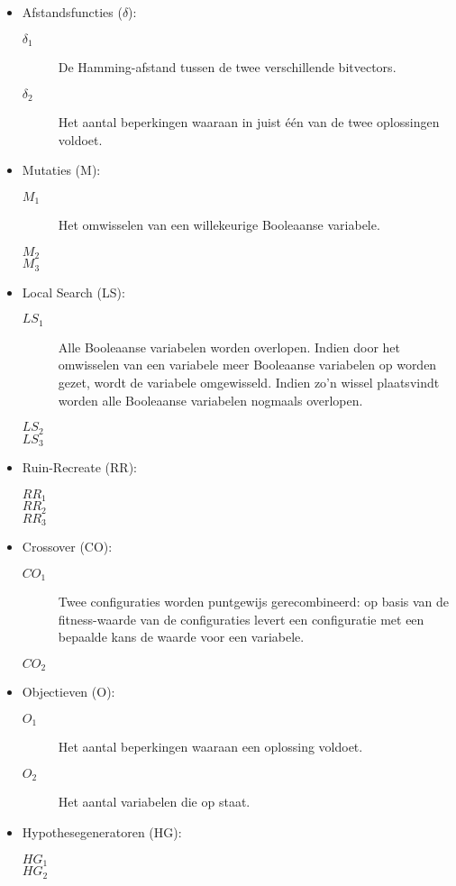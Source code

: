 \begin{itemize}
 \item Afstandsfuncties ($\delta$):
\begin{description}
 \item [$\delta_1$] De Hamming-afstand tussen de twee verschillende bitvectors.
 \item [$\delta_2$] Het aantal beperkingen waaraan in juist \'e\'en van de twee oplossingen voldoet.
\end{description}
 \item Mutaties (M):
\begin{description}
 \item [$M_1$] Het omwisselen van een willekeurige Booleaanse variabele.
 \item [$M_2$] 
 \item [$M_3$] 
\end{description}
 \item Local Search (LS):
\begin{description}
 \item [$LS_1$] Alle Booleaanse variabelen worden overlopen. Indien door het omwisselen van een variabele meer Booleaanse variabelen op \true{} worden gezet, wordt de variabele omgewisseld. Indien zo'n wissel plaatsvindt worden alle Booleaanse variabelen nogmaals overlopen.
 \item [$LS_2$] 
 \item [$LS_3$] 
\end{description}
 \item Ruin-Recreate (RR):
\begin{description}
 \item [$RR_1$] 
 \item [$RR_2$] 
 \item [$RR_3$] 
\end{description}
\item Crossover (CO):
\begin{description}
 \item [$CO_1$] Twee configuraties worden puntgewijs gerecombineerd: op basis van de fitness-waarde van de configuraties levert een configuratie met een bepaalde kans de waarde voor een variabele.
 \item [$CO_2$] 
\end{description}
\item Objectieven (O):
\begin{description}
 \item [$O_1$] Het aantal beperkingen waaraan een oplossing voldoet.
 \item [$O_2$] Het aantal variabelen die op \true{} staat.
\end{description}
\item Hypothesegeneratoren (HG):
\begin{description}
 \item [$HG_1$] 
 \item [$HG_2$] 
\end{description}
\end{itemize}


